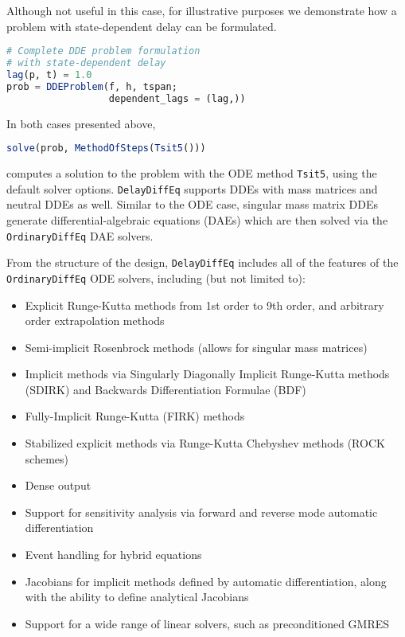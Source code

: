 \documentclass{juliacon}
\def\pkg#1{\texttt{#1}}
\def\alg#1{\texttt{#1}}
\begin{document}
Although not useful in this case, for illustrative purposes we demonstrate how a
problem with state-dependent delay can be formulated.

\begin{lstlisting}[language = Julia]
# Complete DDE problem formulation
# with state-dependent delay
lag(p, t) = 1.0
prob = DDEProblem(f, h, tspan;
                  dependent_lags = (lag,))
\end{lstlisting}

In both cases presented above, 

\begin{lstlisting}[language = Julia]
solve(prob, MethodOfSteps(Tsit5()))
\end{lstlisting}

computes a solution to the problem with the ODE method \alg{Tsit5}, using the
default solver options. \pkg{DelayDiffEq} supports DDEs with mass matrices and neutral 
DDEs as well. Similar to the ODE case, singular mass matrix DDEs generate
differential-algebraic equations (DAEs) which are then solved via the \pkg{OrdinaryDiffEq}
DAE solvers. 

From the structure of the design, \pkg{DelayDiffEq} includes all of the features of the
\pkg{OrdinaryDiffEq} ODE solvers, including (but not limited to):

\begin{itemize}
    \item Explicit Runge-Kutta methods from 1st order to 9th order, and arbitrary order extrapolation methods
    \item Semi-implicit Rosenbrock methods (allows for singular mass matrices)
    \item Implicit methods via Singularly Diagonally Implicit Runge-Kutta methods (SDIRK) and Backwards Differentiation Formulae (BDF)
    \item Fully-Implicit Runge-Kutta (FIRK) methods
    \item Stabilized explicit methods via Runge-Kutta Chebyshev methods (ROCK schemes)
    \item Dense output
    \item Support for sensitivity analysis via forward and reverse mode automatic differentiation
    \item Event handling for hybrid equations
    \item Jacobians for implicit methods defined by automatic differentiation, along with the ability to define analytical Jacobians
    \item Support for a wide range of linear solvers, such as preconditioned GMRES
\end{itemize}
\end{document}

